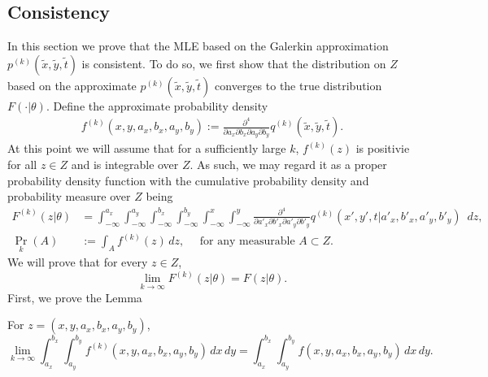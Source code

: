 \subsection{Consistency}
In this section we prove that the MLE based on the Galerkin
approximation $p^{(k)}(\tilde{x},\tilde{y},\tilde{t})$ is
consistent. To do so, we first show that the distribution on $Z$ based
on the approximate $p^{(k)}(\tilde{x},\tilde{y},\tilde{t})$ converges
to the true distribution $F(\cdot | \theta)$. Define the approximate probability
density
\begin{align}
  f^{(k)}(x,y,a_x,b_x,a_y,b_y) := \frac{\partial^4}{\partial
  a_x \partial b_x \partial a_y \partial b_y}
  q^{(k)}(\tilde{x},\tilde{y},\tilde{t}). \label{eq:galerkin-density}
\end{align}
At this point we will assume that for a sufficiently large $k$,
$f^{(k)}(z)$ is positivie for all $z \in Z$ and is integrable over
$Z$. As such, we may regard it as a proper probability density
function with the cumulative probability density and probability
measure over $Z$ being
\begin{align}
  F^{(k)}(z | \theta) &= \displaystyle \int_{-\infty}^{a_x} \displaystyle \int_{-\infty}^{a_y} \displaystyle \int_{-\infty}^{b_x} \displaystyle \int_{-\infty}^{b_y} \displaystyle \int_{-\infty}^x \displaystyle \int_{-\infty}^y \frac{\partial^4}{\partial a'_x \partial b'_x \partial a'_y \partial b'_y} q^{(k)}(x', y', t | a'_x, b'_x, a'_y, b'_y)\,\,\, dz, \label{eq:approx-measure} \\
                          \Pr_{k}(A) &:= \displaystyle \int_{A} f^{(k)}(z)\, dz, \quad \mbox{ for any measurable } A \subset Z. \label{eq:approx-measure-2}
\end{align}
We will prove that for every $z \in Z$,
\[
  \lim_{k\to \infty} F^{(k)}(z | \theta) = F(z | \theta).
\]
First, we prove the Lemma
\begin{lemma}\label{lem:1}
  For $z = (x, y, a_x, b_x, a_y, b_y)$,
  \[
    \lim_{k\to \infty} \displaystyle \int_{a_x}^{b_x} \displaystyle
    \int_{a_y}^{b_y} f^{(k)}(x,y,a_x,b_x,a_y,b_y)\, dx\,dy =
    \displaystyle \int_{a_x}^{b_x} \displaystyle \int_{a_y}^{b_y}
    f(x,y,a_x,b_x,a_y,b_y)\, dx\,dy.
  \]
\end{lemma}
